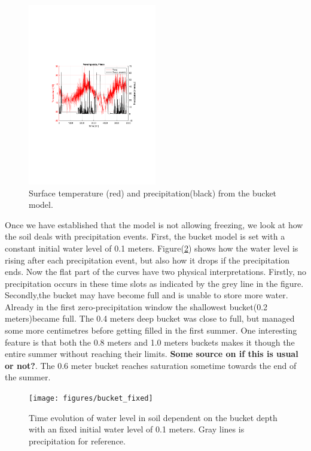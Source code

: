 \documentclass[a4paper,11pt,twocolumn]{article}
\begin{document}
\begin{figure}[h]
	\centering 
	\includegraphics[width=0.5\textwidth]{figures/precip}
	\caption{Surface temperature (red) and precipitation(black) from the bucket model.}
	\label{fig:precip}
\end{figure}

Once we have established that the model is not allowing freezing, we look at how the soil deals with precipitation events. First, the bucket model is set with a constant initial water level of 0.1 meters. Figure(\ref{fig:bucket_fixed}) shows how the water level is rising after each precipitation event, but also how it drops if the precipitation ends. Now the flat part of the curves have two physical interpretations. Firstly, no precipitation occurs in these time slots as indicated by the grey line in the figure. Secondly,the bucket may have become full and is unable to store more water. Already in the first zero-precipitation window the shallowest bucket(0.2 meters)became full. The 0.4 meters deep bucket was close to full, but managed some more centimetres before getting filled in the first summer.
One interesting feature is that both the 0.8 meters and 1.0 meters buckets makes it though the entire summer without reaching their limits. \textbf{Some source on if this is usual or not?}. The 0.6 meter bucket reaches saturation sometime towards the end of the summer. 

\begin{figure}[h]
	\centering 
	\texttt{[image: figures/bucket\_fixed]}
	\caption{Time evolution of water level in soil dependent on the bucket depth with an fixed initial water level of 0.1 meters. Gray lines is precipitation for reference.}
	\label{fig:bucket_fixed}
\end{figure}
\end{document}
